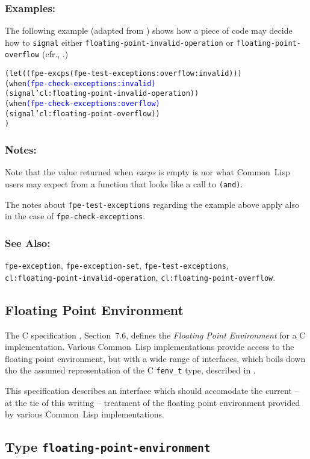 \documentclass[10pt,fleqn]{article}
\newcommand{\CL}{\textsf{Common~Lisp}}
\newcommand{\CLang}{\textsf{C}}
\newcommand{\code}[1]{\texttt{#1}}
\newcommand{\varname}[1]{\textit{#1}}
\newcommand{\DDictionaryItem}[1]{\vspace*{6pt}\noindent\hrulefill\vspace*{-9pt}\subsection*{#1}}
\newcommand{\DExamples}{\subsubsection*{Examples:}}
\newcommand{\DNotes}{\subsubsection*{Notes:}}
\newcommand{\DSeeAlso}{\subsubsection*{See Also:}}
\begin{document}
\DExamples{}

The following example (adapted from \cite{2018:C18}) shows how a piece of
code may decide how to \code{signal} either
\code{floating-point-invalid-operation} or
\code{floating-point-overflow} (cfr., \cite{1996:ANSIHyperSpec}.)

\begin{alltt}
(let ((fpe-excps (fpe-test-exceptions :overflow :invalid)))
   (when \textcolor{blue}{(fpe-check-exceptions :invalid)}
     (signal 'cl:floating-point-invalid-operation))
   (when \textcolor{blue}{(fpe-check-exceptions :overflow)}
     (signal 'cl:floating-point-overflow))
   )
\end{alltt}

\DNotes{}

Note that the value returned when \varname{excps} is empty is nor what
\CL{} users may expect from a function that looks like a call to
\code{(and)}.

The notes about \code{fpe-test-exceptions} regarding the example above
apply also in the case of \code{fpe-check-exceptions}.



\DSeeAlso{}

\code{fpe-exception}, \code{fpe-exception-set},
\code{fpe-test-exceptions},\\
\code{cl:floating-point-invalid-operation},
\code{cl:floating-point-overflow}.








\subsection{Floating Point Environment}

The \CLang{} specification \cite{2018:C18}, Section~7.6, defines the \emph{Floating
  Point Environment} for a \CLang{} implementation.  Various \CL{}
implementations provide access to the floating point environment, but
with a wide range of interfaces, which boils down tho the assumed
representation of the \CLang{} \code{fenv\_t} type, described in
\cite{2018:C18}.

This specification describes an interface which should accomodate the
current -- at the tie of this writing -- treatment of the floating
point environment provided by various \CL{} implementations.


\DDictionaryItem{Type \code{floating-point-environment}}
\end{document}
